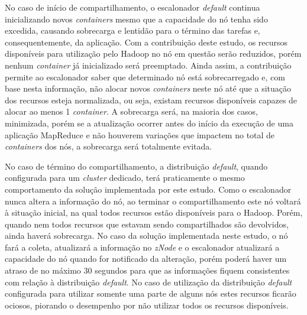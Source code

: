 No caso de início de compartilhamento, o escalonador \textit{default} continua inicializando novos \textit{containers} mesmo que a capacidade do nó tenha sido excedida, causando sobrecarga e lentidão para o término das tarefas e, consequentemente, da aplicação. Com a contribuição deste estudo, os recursos disponíveis para utilização pelo Hadoop no nó em questão serão reduzidos, porém nenhum \textit{container} já inicializado será preemptado. Ainda assim, a contribuição permite ao escalonador saber que determinado nó está sobrecarregado e, com base nesta informação, não alocar novos \textit{containers} neste nó até que a situação dos recursos esteja normalizada, ou seja, existam recursos disponíveis capazes de alocar ao menos 1 \textit{container}. A sobrecarga será, na maioria dos casos, minimizada, porém se a atualização ocorrer antes do início da execução de uma aplicação MapReduce e não houverem variações que impactem no total de \textit{containers} dos nós, a sobrecarga será totalmente evitada.

No caso de término do compartilhamento, a distribuição \textit{default}, quando configurada para um \textit{cluster} dedicado, terá praticamente o mesmo comportamento da solução implementada por este estudo. Como o escalonador nunca altera a informação do nó, ao terminar o compartilhamento este nó voltará à situação inicial, na qual todos recursos estão disponíveis para o Hadoop. Porém, quando nem todos recursos que estavam sendo compartilhados são devolvidos, ainda haverá sobrecarga. No caso da solução implementada neste estudo, o nó fará a coleta, atualizará a informação no \textit{zNode} e o escalonador atualizará a capacidade do nó quando for notificado da alteração, porém poderá haver um atraso de no máximo 30 segundos para que as informações fiquem consistentes com relação à distribuição \textit{default}. No caso de utilização da distribuição \textit{default} configurada para utilizar somente uma parte de alguns nós estes recursos ficarão ociosos, piorando o desempenho por não utilizar todos os recursos disponíveis.

